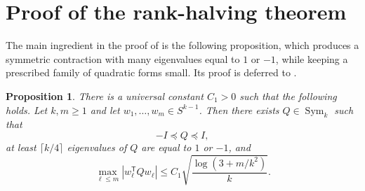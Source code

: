 \documentclass[11pt,reqno,letterpaper]{amsart}
\newtheorem{proposition}[proposition]{Proposition}
\newcommand{\Sym}{\operatorname{Sym}}
\newcommand{\abs}[1]{\left\lvert #1\right\rvert}
\begin{document}
\section{Proof of the rank-halving theorem}
\label{sec:rank-halving}

The main ingredient in the proof of  is the following
proposition, which produces a symmetric contraction with many eigenvalues
equal to $1$ or $-1$, while keeping a prescribed family of quadratic
forms small. Its proof is deferred to .

\begin{proposition}\label{prop:spectral}
There is a universal constant $C_1>0$ such that the following holds.
Let $k,m\geq1$ and let $w_1,\ldots,w_m\in S^{k-1}$. Then there exists
$Q\in\Sym_k$ such that
\[
 -I\preceq Q\preceq I,
\]
at least $\lceil k/4\rceil$ eigenvalues of $Q$ are equal to $1$ or
$-1$, and
\[
 \max_{\ell\leq m}
 \abs{w_\ell^{\mathsf T}Qw_\ell}
 \leq
 C_1\sqrt{\frac{\log(3+m/k^2)}{k}}.
\]
\end{proposition}
\end{document}
